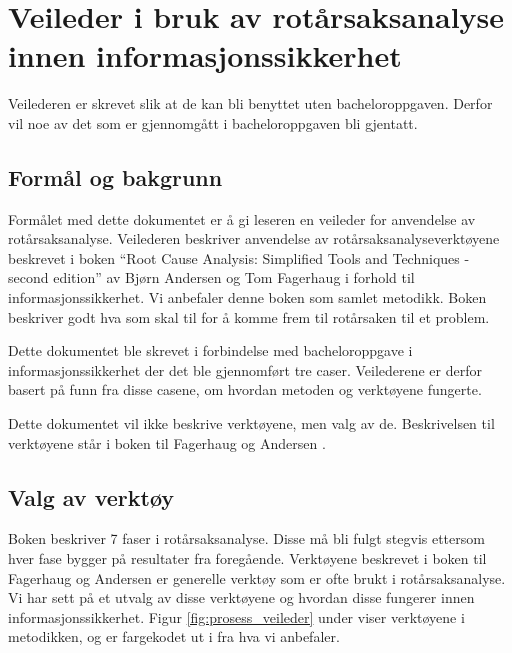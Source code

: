 \chapter{Veileder i bruk av rotårsaksanalyse innen informasjonssikkerhet}
\label{kap:veiledning-RCA}
Veilederen er skrevet slik at de kan bli benyttet uten bacheloroppgaven. Derfor vil noe av det som er gjennomgått i bacheloroppgaven bli gjentatt.

\section{Formål og bakgrunn}
Formålet med dette dokumentet er å gi leseren en veileder for anvendelse av rotårsaksanalyse. Veilederen beskriver anvendelse av rotårsaksanalyseverktøyene beskrevet i boken ``Root Cause Analysis: Simplified Tools and Techniques - second edition'' av Bjørn Andersen og Tom Fagerhaug \cite{RCA} i forhold til informasjonssikkerhet. Vi anbefaler denne boken som samlet metodikk. Boken beskriver godt hva som skal til for å komme frem til rotårsaken til et problem. 

Dette dokumentet ble skrevet i forbindelse med bacheloroppgave i informasjonssikkerhet der det ble gjennomført tre caser. Veilederene er derfor basert på funn fra disse casene, om hvordan metoden og verktøyene fungerte.

Dette dokumentet vil ikke beskrive verktøyene, men valg av de. Beskrivelsen til verktøyene står i boken til Fagerhaug og Andersen \cite{RCA}.

\section{Valg av verktøy}
Boken beskriver 7 faser i rotårsaksanalyse. Disse må bli fulgt stegvis ettersom hver fase bygger på resultater fra foregående. Verktøyene beskrevet i boken til Fagerhaug og Andersen \cite{RCA} er generelle verktøy som er ofte brukt i rotårsaksanalyse. Vi har sett på et utvalg av disse verktøyene og hvordan disse fungerer innen informasjonssikkerhet. Figur \ref{fig:prosess_veileder} under viser verktøyene i metodikken, og er fargekodet ut i fra hva vi anbefaler. 

